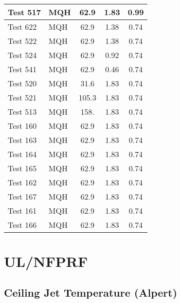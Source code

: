 \begin{table}[!ht]
\begin{center}
\begin{tabular}{|l|l|c|c|c|}
Test 517   &  MQH               &  62.9           &  1.83        &  0.99        \\ \hline
Test 622   &  MQH               &  62.9           &  1.38        &  0.74        \\ \hline
Test 522   &  MQH               &  62.9           &  1.38        &  0.74        \\ \hline
Test 524   &  MQH               &  62.9           &  0.92        &  0.74        \\ \hline
Test 541   &  MQH               &  62.9           &  0.46        &  0.74        \\ \hline
Test 520   &  MQH               &  31.6           &  1.83        &  0.74        \\ \hline
Test 521   &  MQH               &  105.3          &  1.83        &  0.74        \\ \hline
Test 513   &  MQH               &  158.           &  1.83        &  0.74        \\ \hline
Test 160   &  MQH               &  62.9           &  1.83        &  0.74        \\ \hline
Test 163   &  MQH               &  62.9           &  1.83        &  0.74        \\ \hline
Test 164   &  MQH               &  62.9           &  1.83        &  0.74        \\ \hline
Test 165   &  MQH               &  62.9           &  1.83        &  0.74        \\ \hline
Test 162   &  MQH               &  62.9           &  1.83        &  0.74        \\ \hline
Test 167   &  MQH               &  62.9           &  1.83        &  0.74        \\ \hline
Test 161   &  MQH               &  62.9           &  1.83        &  0.74        \\ \hline
Test 166   &  MQH               &  62.9           &  1.83        &  0.74        \\ \hline
\end{tabular}
\end{center}
\end{table}


\clearpage


\section{UL/NFPRF}

\subsection*{Ceiling Jet Temperature (Alpert)}

